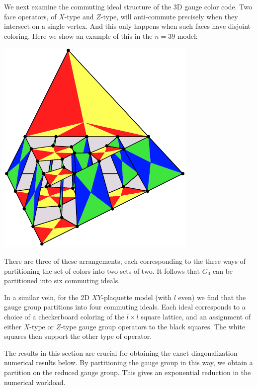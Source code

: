 \documentclass[a4paper,onecolumn,11pt,unpublished]{quantumarticle}
\begin{document}
We next examine the commuting ideal structure of the 3D gauge color code.
Two face operators, of $X$-type and $Z$-type,
will anti-commute precisely when they intersect on a single vertex.
And this only happens when such faces have disjoint coloring.
Here we show an example of this in the $n=39$ model:
\begin{center}
\includegraphics{pic-gcolor-ideal.pdf}
\end{center}
There are three of these arrangements,
each corresponding to the three ways of
partitioning the set of colors into two sets of two.
It follows that $G_0$
can be partitioned into six commuting ideals.

In a similar vein,
for the 2D $XY$-plaquette model (with $l$ even)
we find that the gauge group partitions
into four commuting ideals.
Each ideal corresponds to a choice of 
a checkerboard coloring of the $l\times l$ square lattice,
and an assignment of either $X$-type or $Z$-type
gauge group operators to the black squares.
The white squares then support the other type of operator.

The results in this section are crucial for obtaining the exact
diagonalization numerical results below.
By partitioning the gauge group in this way, 
we obtain a partition on the reduced gauge group. 
This gives an exponential reduction
in the numerical workload.

\end{document}
